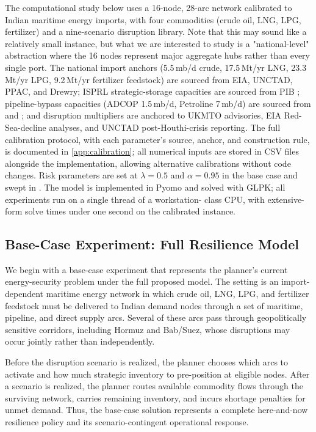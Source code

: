 \documentclass[final,3p,authoryear]{elsarticle}
\theoremstyle{definition}
\begin{document}
The computational study below uses a 16-node, 28-arc network calibrated
to Indian maritime energy imports, with four commodities (crude oil,
LNG, LPG, fertilizer) and a nine-scenario disruption library. 
Note that this may sound like a relatively small instance, but what we are interested to study is a "national-level" abstraction where the 16 nodes represent major aggregate hubs rather than every single port.
The national
import anchors (5.5\,mb/d crude, 17.5\,Mt/yr LNG, 23.3\,Mt/yr LPG,
9.2\,Mt/yr fertilizer feedstock) are sourced from EIA, UNCTAD, PPAC,
and Drewry; ISPRL strategic-storage capacities are sourced from PIB
\citep{pib2021spr}; pipeline-bypass capacities (ADCOP 1.5\,mb/d,
Petroline 7\,mb/d) are sourced from \cite{iea2026hormuz} and
\cite{cnbc2026pipelines}; and disruption multipliers are anchored to
UKMTO advisories, EIA Red-Sea-decline analyses, and UNCTAD
post-Houthi-crisis reporting. The full calibration protocol, with each
parameter's source, anchor, and construction rule, is documented in
\ref{app:calibration}; all numerical inputs are stored in CSV
files alongside the implementation, allowing alternative calibrations
without code changes. Risk parameters are set at $\lambda=0.5$ and
$\alpha=0.95$ in the base case and swept in
. The model is implemented in Pyomo and solved
with GLPK; all experiments run on a single thread of a workstation-
class CPU, with extensive-form solve times under one second on the
calibrated instance.

\subsection{Base-Case Experiment: Full Resilience Model}
\label{sec:base-case}

We begin with a base-case experiment that represents the planner's
current energy-security problem under the full proposed model. The
setting is an import-dependent maritime energy network in which crude
oil, LNG, LPG, and fertilizer feedstock must be delivered to Indian
demand nodes through a set of maritime, pipeline, and direct supply
arcs. Several of these arcs pass through geopolitically sensitive
corridors, including Hormuz and Bab/Suez, whose disruptions may occur
jointly rather than independently.

Before the disruption scenario is realized, the planner chooses which
arcs to activate and how much strategic inventory to pre-position at
eligible nodes. After a scenario is realized, the planner routes
available commodity flows through the surviving network, carries
remaining inventory, and incurs shortage penalties for unmet demand.
Thus, the base-case solution represents a complete here-and-now
resilience policy and its scenario-contingent operational response.
\end{document}
